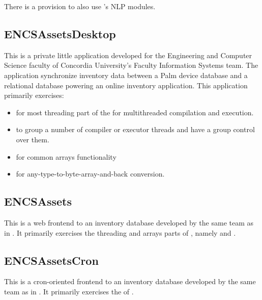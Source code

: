 There is a provision to also use {\marf}'s NLP modules.


%
%

\subsection{ENCSAssetsDesktop}
\label{sect:encs-assets-desktop}

This is a private little application developed for the Engineering and Computer Science
faculty of Concordia University's Faculty Information Systems team. The application
synchronize inventory data between a Palm device database and a relational database
powering an online inventory application. This application primarily exercises:

\begin{itemize}
\item
     for most threading part of the {\gipsy} for multithreaded
    compilation and execution.
\item
     to group a number of compiler or executor threads
    and have a group control over them.
\item
     for common arrays functionality
\item
	 for any-type-to-byte-array-and-back conversion.
\end{itemize}


%
%

\subsection{ENCSAssets}

This is a web frontend to an inventory database developed by the same team as
in . It primarily exercises the threading
and arrays parts of {\marf}, namely  and .

%
%

\subsection{ENCSAssetsCron}

This is a cron-oriented frontend to an inventory database developed by the same team as
in . It primarily exercises the 
of {\marf}.


